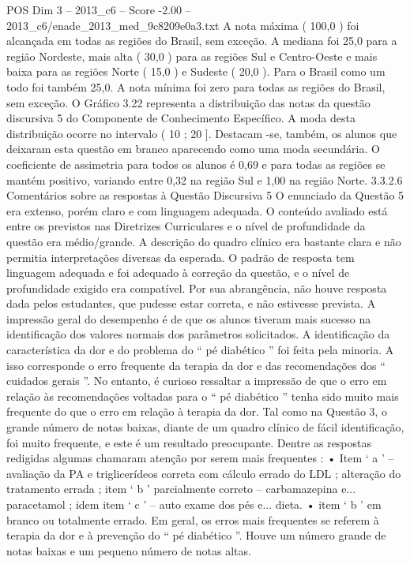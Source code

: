 \begin{textsample}{POS Dim 3 – 2013\_c6 – Score -2.00 – 2013\_c6/enade\_2013\_med\_9c8209e0a3.txt}
A nota máxima ( 100,0 ) foi alcançada em todas as regiões do Brasil, sem exceção.
A mediana foi 25,0 para a região Nordeste, mais alta ( 30,0 ) para as regiões Sul e Centro-Oeste e mais baixa para as regiões Norte ( 15,0 ) e Sudeste ( 20,0 ).
Para o Brasil como um todo foi também 25,0.
A nota mínima foi zero para todas as regiões do Brasil, sem exceção.
O Gráfico 3.22 representa a distribuição das notas da questão discursiva 5 do Componente de Conhecimento Específico.
A moda desta distribuição ocorre no intervalo ( 10 ; 20 ].
Destacam -se, também, os alunos que deixaram esta questão em branco aparecendo como uma moda secundária.
O coeficiente de assimetria para todos os alunos é 0,69 e para todas as regiões se mantém positivo, variando entre 0,32 na região Sul e 1,00 na região Norte. 3.3.2.6 Comentários sobre as respostas à Questão Discursiva 5 O enunciado da Questão 5 era extenso, porém claro e com linguagem adequada.
O conteúdo avaliado está entre os previstos nas Diretrizes Curriculares e o nível de profundidade da questão era médio/grande.
A descrição do quadro clínico era bastante clara e não permitia interpretações diversas da esperada.
O padrão de resposta tem linguagem adequada e foi adequado à correção da questão, e o nível de profundidade exigido era compatível.
Por sua abrangência, não houve resposta dada pelos estudantes, que pudesse estar correta, e não estivesse prevista.
A impressão geral do desempenho é de que os alunos tiveram mais sucesso na identificação dos valores normais dos parâmetros solicitados.
A identificação da característica da dor e do problema do “ pé diabético ” foi feita pela minoria.
A isso corresponde o erro frequente da terapia da dor e das recomendações dos “ cuidados gerais ”.
No entanto, é curioso ressaltar a impressão de que o erro em relação às recomendações voltadas para o “ pé diabético ” tenha sido muito mais frequente do que o erro em relação à terapia da dor.
Tal como na Questão 3, o grande número de notas baixas, diante de um quadro clínico de fácil identificação, foi muito frequente, e este é um resultado preocupante.
Dentre as respostas redigidas algumas chamaram atenção por serem mais frequentes : • Item ‘ a ’ – avaliação da PA e triglicerídeos correta com cálculo errado do LDL ; alteração do tratamento errada ; item ‘ b ’ parcialmente correto – carbamazepina e... paracetamol ; idem item ‘ c ’ – auto exame dos pés e... dieta. • item ‘ b ’ em branco ou totalmente errado.
Em geral, os erros mais frequentes se referem à terapia da dor e à prevenção do “ pé diabético ”.
Houve um número grande de notas baixas e um pequeno número de notas altas.

\end{textsample}
